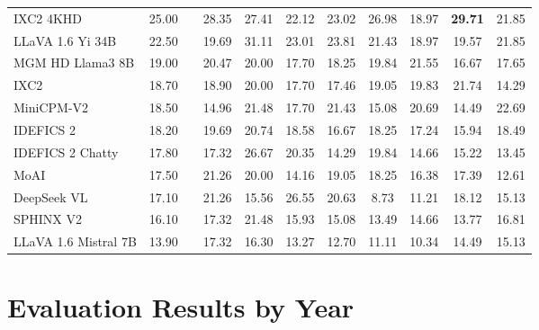 \begin{table}[h]
{\begin{tabular}{lalcccccccc@{}}
IXC2 4KHD \cite{dong2024internlmxcomposer24khd} & 25.00 &  & 28.35 & 27.41 & 22.12 & 23.02 & 26.98 & 18.97 & \textbf{29.71} & 21.85 \\
LLaVA 1.6 Yi 34B \cite{liu2024llavanext} & 22.50 &  & 19.69 & 31.11 & 23.01 & 23.81 & 21.43 & 18.97 & 19.57 & 21.85 \\
MGM HD Llama3 8B \cite{li2024minigemini} & 19.00 &  & 20.47 & 20.00 & 17.70 & 18.25 & 19.84 & 21.55 & 16.67 & 17.65 \\
IXC2 \cite{chen2023internvl} & 18.70 &  & 18.90 & 20.00 & 17.70 & 17.46 & 19.05 & 19.83 & 21.74 & 14.29 \\
MiniCPM-V2 \cite{viscpm} & 18.50 &  & 14.96 & 21.48 & 17.70 & 21.43 & 15.08 & 20.69 & 14.49 & 22.69 \\
IDEFICS 2 \cite{laurenccon2024matters} & 18.20 &  & 19.69 & 20.74 & 18.58 & 16.67 & 18.25 & 17.24 & 15.94 & 18.49 \\
IDEFICS 2 Chatty \cite{laurenccon2024matters} & 17.80 &  & 17.32 & 26.67 & 20.35 & 14.29 & 19.84 & 14.66 & 15.22 & 13.45 \\
MoAI \cite{lee2024moai} & 17.50 &  & 21.26 & 20.00 & 14.16 & 19.05 & 18.25 & 16.38 & 17.39 & 12.61 \\
DeepSeek VL \cite{lu2024deepseekvl} & 17.10 &  & 21.26 & 15.56 & 26.55 & 20.63 & 8.73 & 11.21 & 18.12 & 15.13 \\
SPHINX V2 \cite{gao2024sphinxx} & 16.10 &  & 17.32 & 21.48 & 15.93 & 15.08 & 13.49 & 14.66 & 13.77 & 16.81 \\
LLaVA 1.6 Mistral 7B \cite{liu2024llavanext} & 13.90 &  & 17.32 & 16.30 & 13.27 & 12.70 & 11.11 & 10.34 & 14.49 & 15.13 \\
    \bottomrule
    \hline
    
  \end{tabular}
  }
  \label{tab:val_reas_set_subject}
\vspace{-3ex}
\end{table}

\newpage
\section{Evaluation Results by Year}
\label{sec:eval_by_year}
